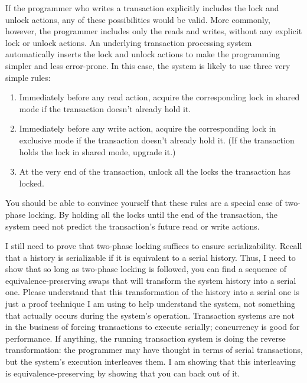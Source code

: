 If the programmer who writes a transaction explicitly includes the
lock and unlock actions, any of these possibilities would be valid.
More commonly, however, the programmer includes only the
reads and writes, without any explicit lock or unlock actions.  An
underlying transaction processing system automatically inserts the
lock and unlock actions to make the programming simpler and
less error-prone.  In this case, the system is likely to use
three very simple rules\label{simple-two-phase}:
\begin{enumerate}
\item
Immediately before any read action, acquire the corresponding lock in
shared mode if the transaction doesn't already hold it.
\item
Immediately before any write action, acquire the corresponding lock in
exclusive mode if the transaction doesn't already hold it.  (If the
transaction holds the lock in shared mode, upgrade it.)
\item
At the very end of the transaction, unlock all the locks the
transaction has locked.
\end{enumerate}
You should be able to convince yourself that these rules are a special
case of two-phase locking.  By holding all the locks until the end of
the transaction, the system need not predict the transaction's future
read or write actions.

I still need to prove that two-phase locking suffices to ensure
serializability.  Recall that a history is serializable if it is
equivalent to a serial history.  Thus, I need to show that so long as
two-phase locking is followed, you can find a sequence of
equivalence-preserving swaps that will transform the system history
into a serial one.  Please understand that this transformation of the
history into a serial one is just a proof technique I am using to
help understand the system, not something that actually occurs during
the system's operation.  Transaction systems are not in the business
of forcing transactions to execute serially; concurrency is good for
performance.  If anything, the running transaction system is doing the
reverse transformation: the programmer may have thought in terms of
serial transactions, but the system's execution interleaves them.  I
am showing that this interleaving is equivalence-preserving by
showing that you can back out of it.

